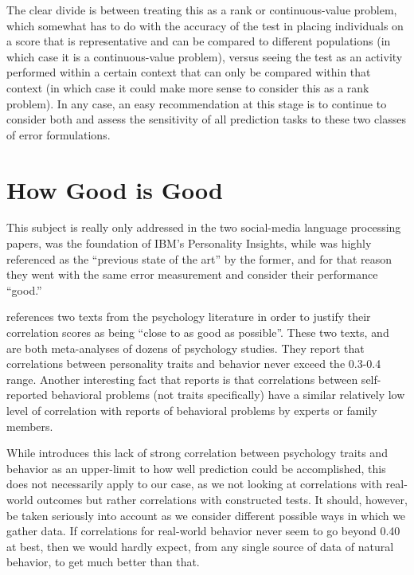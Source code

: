 \documentclass[a4paper,12pt]{article}
\begin{document}
The clear divide is between treating this as a rank or continuous-value problem, which somewhat has to do with the accuracy of the test in placing individuals on a score that is representative and can be compared to different populations (in which case it is a continuous-value problem), versus seeing the test as an activity performed within a certain context that can only be compared within that context (in which case it could make more sense to consider this as a rank problem). In any case, an easy recommendation at this stage is to continue to consider both and assess the sensitivity of all prediction tasks to these two classes of error formulations.

\section{How Good is Good}

This subject is really only addressed in the two social-media language processing papers, \cite{Arnoux2017} was the foundation of IBM's Personality Insights, while \cite{Schwartz2013} was highly referenced as the ``previous state of the art'' by the former, and for that reason they went with the same error measurement and consider their performance ``good.''

\cite{Schwartz2013} references two texts from the psychology literature in order to justify their correlation scores as being ``close to as good as possible''. These two texts, \cite{Roberts2007} and \cite{Meyer2001} are both meta-analyses of dozens of psychology studies. They report that correlations between personality traits and behavior never exceed the 0.3-0.4 range. Another interesting fact that \cite{Meyer2001} reports is that correlations between self-reported behavioral problems (not traits specifically) have a similar relatively low level of correlation with reports of behavioral problems by experts or family members.

While \cite{Schwartz2013} introduces this lack of strong correlation between psychology traits and behavior as an upper-limit to how well prediction could be accomplished, this does not necessarily apply to our case, as we not looking at correlations with real-world outcomes but rather correlations with constructed tests. It should, however, be taken seriously into account as we consider different possible ways in which we gather data. If correlations for real-world behavior never seem to go beyond 0.40 at best, then we would hardly expect, from any single source of data of natural behavior, to get much better than that.
\end{document}
